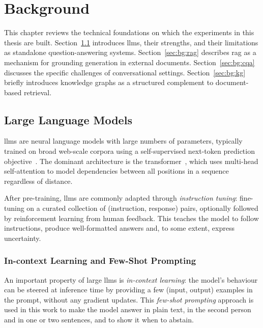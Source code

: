 
\chapter{Background}\label{ch:background}

This chapter reviews the technical foundations on which the experiments in this
thesis are built. Section~\ref{sec:bg:llm} introduces \glspl{llm}, their strengths,
and their limitations as standalone question-answering systems. Section~\ref{sec:bg:rag}
describes \gls{rag} as a mechanism for grounding generation in external documents.
Section~\ref{sec:bg:cqa} discusses the specific challenges of conversational
settings. Section~\ref{sec:bg:kg} briefly introduces knowledge graphs as a
structured complement to document-based retrieval.


\section{Large Language Models}\label{sec:bg:llm}

\Glspl{llm} are neural language models with large numbers of parameters, typically
trained on broad web-scale corpora using a self-supervised next-token prediction
objective~\cite{brown2020gpt3}. The dominant architecture is the
transformer~\cite{vaswani2017attention}, which uses multi-head self-attention to
model dependencies between all positions in a sequence regardless of distance.

After pre-training, \glspl{llm} are commonly adapted through \emph{instruction
tuning}: fine-tuning on a curated collection of (instruction, response) pairs,
optionally followed by reinforcement learning from human feedback. This teaches the model to follow instructions, produce well-formatted
answers and, to some extent, express uncertainty.

\subsection{In-context Learning and Few-Shot Prompting}

An important property of large \glspl{llm} is \emph{in-context learning}: the
model's behaviour can be steered at inference time by providing a few
(input, output) examples in the prompt, without any gradient updates. This
\emph{few-shot prompting} approach is used in this work to make the model answer in
plain text, in the second person and in one or two sentences, and to show it when to
abstain.

